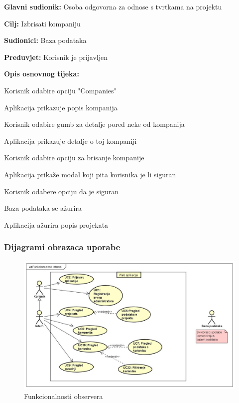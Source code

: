 					\noindent {}
					\begin{packed_item}

						\item \textbf{Glavni sudionik:} Osoba odgovorna za odnose s tvrtkama na projektu
						\item \textbf{Cilj:} Izbrisati kompaniju
						\item \textbf{Sudionici:} Baza podataka
						\item \textbf{Preduvjet:} Korisnik je prijavljen
						\item \textbf{Opis osnovnog tijeka:}

						\item[] \begin{packed_enum}

							\item Korisnik odabire opciju "Companies"
							\item Aplikacija prikazuje popis kompanija
							\item Korisnik odabire gumb za detalje pored neke od kompanija
							\item Aplikacija prikazuje detalje o toj kompaniji
							\item Korisnik odabire opciju za brisanje kompanije
							\item Aplikacija prikaže modal koji pita korisnika je li siguran
							\item Korisnik odabere opciju da je siguran
							\item Baza podataka se ažurira
							\item Aplikacija ažurira popis projekata

						\end{packed_enum}

					\end{packed_item}

				\subsubsection{Dijagrami obrazaca uporabe}

					\begin{figure}[H]
						\includegraphics[scale=0.3]{slike/UC dijagrami/UseCase observer}
						\centering
						\caption{Funkcionalnosti observera}
						\label{fig:observer}
					\end{figure}

